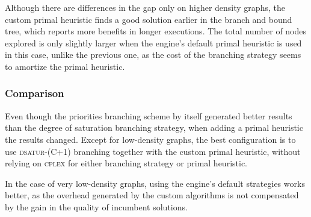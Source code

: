 Although there are differences in the gap only on higher density graphs, the custom primal heuristic finds a good solution earlier in the branch and bound tree, which reports more benefits in longer executions. The total number of nodes explored is only slightly larger when the engine's default primal heuristic is used in this case, unlike the previous one, as the cost of the branching strategy seems to amortize the primal heuristic. 

\subsubsection{Comparison}

Even though the priorities branching scheme by itself generated better results than the degree of saturation branching strategy, when adding a primal heuristic the results changed. Except for low-density graphs, the best configuration is to use \textsc{dsatur-(C+1)} branching together with the custom primal heuristic, without relying on \textsc{cplex} for either branching strategy or primal heuristic. 

In the case of very low-density graphs, using the engine's default strategies works better, as the overhead generated by the custom algorithms is not compensated by the gain in the quality of incumbent solutions. 